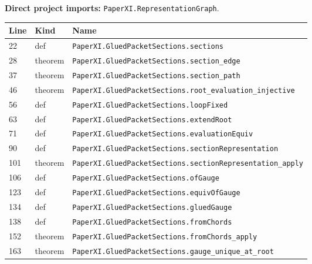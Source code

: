 \documentclass[10pt,oneside]{book}
\begin{document}

\textbf{Direct project imports:} \nolinkurl{PaperXI.RepresentationGraph}.

\begin{longtable}{@{}p{}p{}p{}@{}}\toprule Line&Kind&Name\\\midrule\endhead

22&def&\nolinkurl{PaperXI.GluedPacketSections.sections}\\

28&theorem&\nolinkurl{PaperXI.GluedPacketSections.section_edge}\\

37&theorem&\nolinkurl{PaperXI.GluedPacketSections.section_path}\\

46&theorem&\nolinkurl{PaperXI.GluedPacketSections.root_evaluation_injective}\\

56&def&\nolinkurl{PaperXI.GluedPacketSections.loopFixed}\\

63&def&\nolinkurl{PaperXI.GluedPacketSections.extendRoot}\\

71&def&\nolinkurl{PaperXI.GluedPacketSections.evaluationEquiv}\\

90&def&\nolinkurl{PaperXI.GluedPacketSections.sectionRepresentation}\\

101&theorem&\nolinkurl{PaperXI.GluedPacketSections.sectionRepresentation_apply}\\

106&def&\nolinkurl{PaperXI.GluedPacketSections.ofGauge}\\

123&def&\nolinkurl{PaperXI.GluedPacketSections.equivOfGauge}\\

134&def&\nolinkurl{PaperXI.GluedPacketSections.gluedGauge}\\

138&def&\nolinkurl{PaperXI.GluedPacketSections.fromChords}\\

152&theorem&\nolinkurl{PaperXI.GluedPacketSections.fromChords_apply}\\

163&theorem&\nolinkurl{PaperXI.GluedPacketSections.gauge_unique_at_root}\\

\bottomrule\end{longtable}
\end{document}

